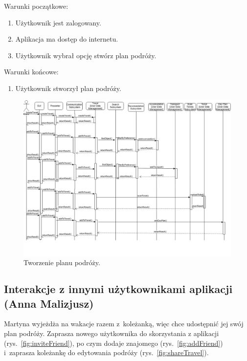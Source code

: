 \documentclass[10pt,twoside,a4paper]{report}
\begin{document}
\noindent\newline Warunki początkowe:
\begin{enumerate}
  \item Użytkownik jest zalogowany.
  \item Aplikacja ma dostęp do internetu.
  \item Użytkownik wybrał opcję stwórz plan podróży.
\end{enumerate}
\par
\noindent\newline
Warunki końcowe:
\begin{enumerate}
  \item Użytkownik stworzył plan podróży.
\end{enumerate}

\noindent\newline
\begin{figure}[h]
\centering
\includegraphics[width=\linewidth]{addTravel}
\caption{Tworzenie planu podróży.}
\label{fig:whileTravelling}
\end{figure}

\subsection{Interakcje z innymi użytkownikami aplikacji (Anna Malizjusz)}
\par Martyna wyjeżdża na wakacje razem z~koleżanką, więc chce udostępnić jej swój plan podróży. Zaprasza nowego użytkownika do skorzystania z aplikacji (rys.~\ref{fig:inviteFriend}), po czym dodaje znajomego (rys.~\ref{fig:addFriend}) i~zaprasza koleżankę do edytowania podróży (rys.~\ref{fig:shareTravel}).
\FloatBarrier
\end{document}
